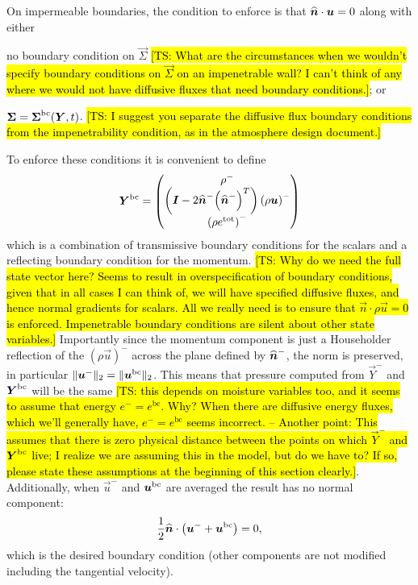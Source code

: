 \documentclass{report}
\begin{document}
On impermeable boundaries, the condition to enforce is that $\nhat
\cdot \vec{u} = 0$ along with either
\begin{enumerate*}[label = (\roman*)]
  \item no boundary condition on $\vec{\Sigma}$ \hl{[TS: What are the circumstances when we wouldn't specify boundary conditions on $\vec{\Sigma}$ on an impenetrable wall? I can't think of any where we would not have diffusive fluxes that need boundary conditions.]}; or
  \item $\vec{\Sigma} = \vec{\Sigma}^{\rm bc}(\vec{Y}, t)$. \hl{[TS: I suggest you separate the diffusive flux boundary conditions from the impenetrability condition, as in the atmosphere design document.]}
\end{enumerate*}
To enforce these conditions it is convenient to define
\begin{align}
  \vec{Y}^{\rm bc}
  =
  \begin{pmatrix}
    \rho^{-}\\
    \left(\vec{I} - 2 \nhat^{-} {\left(\nhat^{-}\right)}^{T}\right)
    {\left(\rho \vec{u}\right)}^{-}\\
    {\left(\rho e^{\rm tot}\right)}^{-}
  \end{pmatrix}
\end{align}
which is a combination of transmissive boundary conditions for the scalars and a reflecting boundary condition for the momentum. \hl{[TS: Why do we need the full state vector here? Seems to result in overspecification of boundary conditions, given that in all cases I can think of, we will have specified diffusive fluxes, and hence normal gradients for scalars. All we really need is to ensure that $\vec{n} \cdot \rho \vec{u}=0$ is enforced. Impenetrable boundary conditions are silent about other state variables.]}
Importantly since the momentum component is just a Householder reflection of the
${\left(\rho \vec{u}\right)}^{-}$ across the plane defined by $\nhat^{-}$, the
norm is preserved, in particular $\|\vec{u}^{-}\|_{2} = \|\vec{u}^{\rm
bc}\|_{2}$. This means that pressure computed from $\vec{Y}^{-}$ and
$\vec{Y}^{\rm bc}$ will be the same \hl{[TS: this depends on moisture variables too, and it seems to assume that energy $e^- = e^\mathrm{bc}$. Why? When there are diffusive energy fluxes, which we'll generally have, $e^- = e^\mathrm{bc}$ seems incorrect. -- Another point: This assumes that there is zero physical distance between the points on which $\vec{Y}^{-}$ and $\vec{Y}^{\rm bc}$ live; I realize we are assuming this in the model, but do we have to? If so, please state these assumptions at the beginning of this section clearly.]}. Additionally, when $\vec{u}^{-}$ and
$\vec{u}^{\rm bc}$ are averaged the result has no normal component:
\begin{align}
  \frac{1}{2}\nhat\cdot\left(\vec{u}^{-} + \vec{u}^{\rm bc}\right) = 0,
\end{align}
which is the desired boundary condition (other components are not modified
including the tangential velocity).
\end{document}
